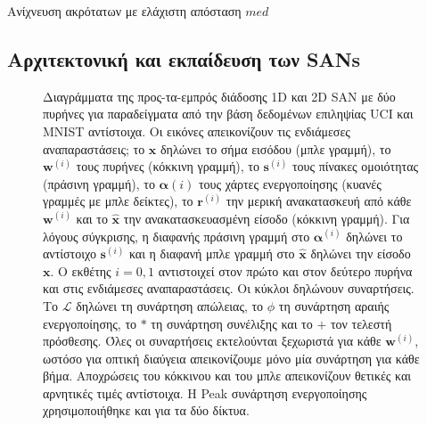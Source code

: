 \begin{algorithm}[H]
	\caption{Ανίχνευση ακρότατων με ελάχιστη απόσταση $med$}
	\label{alg:extrema}
	\scalebox{0.9}{
		\begin{minipage}{\linewidth}
			
		\end{minipage}
		}
\end{algorithm}

\subsection{Αρχιτεκτονική και εκπαίδευση των SANs}

\begin{figure}
	\subfloat[1D SAN]{\begin{tikzpicture}[]
		
	\end{tikzpicture}
	}
	\qquad
	\subfloat[2D SAN]{\begin{tikzpicture}[]
		
	\end{tikzpicture}
	}
	\caption[Διαγράμματα της προς-τα-εμπρός διάδοσης ενός 1D και 2D SAN με δύο πυρήνες για παραδείγματα από την βάση δεδομένων επιληψίας UCI και MNIST αντίστοιχα.]{Διαγράμματα της προς-τα-εμπρός διάδοσης 1D και 2D SAN με δύο πυρήνες για παραδείγματα από την βάση δεδομένων επιληψίας UCI και MNIST αντίστοιχα.
	Οι εικόνες απεικονίζουν τις ενδιάμεσες αναπαραστάσεις; το $\bm{x}$ δηλώνει το σήμα εισόδου (μπλε γραμμή), το $\bm{w}^{(i)}$ τους πυρήνες (κόκκινη γραμμή), το $\bm{s}^{(i)}$ τους πίνακες ομοιότητας (πράσινη γραμμή), το $\bm{\alpha}{(i)}$ τους χάρτες ενεργοποίησης (κυανές γραμμές με μπλε δείκτες), το $\bm{r}^{(i)}$ την μερική ανακατασκευή από κάθε $\bm{w}^{(i)}$ και το $\hat{\bm{x}}$ την ανακατασκευασμένη είσοδο (κόκκινη γραμμή).
	Για λόγους σύγκρισης, η διαφανής πράσινη γραμμή στο $\bm{\alpha}^{(i)}$ δηλώνει το αντίστοιχο $\bm{s}^{(i)}$ και η διαφανή μπλε γραμμή στο $\hat{\bm{x}}$ δηλώνει την είσοδο $\bm{x}$.
	Ο εκθέτης $i = 0,1$ αντιστοιχεί στον πρώτο και στον δεύτερο πυρήνα και στις ενδιάμεσες αναπαραστάσεις.
	Οι κύκλοι δηλώνουν συναρτήσεις. Το $\mathcal{L}$ δηλώνει τη συνάρτηση απώλειας, το $\phi$ τη συνάρτηση αραιής ενεργοποίησης, το $\ast$ τη συνάρτηση συνέλιξης και το $+$ τον τελεστή πρόσθεσης.
	Όλες οι συναρτήσεις εκτελούνται ξεχωριστά για κάθε $\bm{w}^{(i)}$, ωστόσο για οπτική διαύγεια απεικονίζουμε μόνο μία συνάρτηση για κάθε βήμα.
	Αποχρώσεις του κόκκινου και του μπλε απεικονίζουν θετικές και αρνητικές τιμές αντίστοιχα.
	Η Peak συνάρτηση ενεργοποίησης χρησιμοποιήθηκε και για τα δύο δίκτυα.
	}
	\label{fig:sans}
\end{figure}

